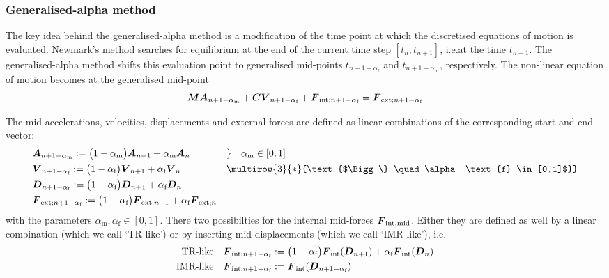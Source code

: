 \subsubsection{Generalised-alpha method}
The key idea behind the generalised-alpha method is a modification of the
time point at
which the discretised equations of motion is evaluated. Newmark's method
searches for equilibrium at the end of the current time step $[t_n,t_{n+1}]$,
i.e.\@ at the time $t_{n+1}$. The generalised-alpha method shifts this
evaluation point to  generalised mid-points
$t_{n+1-\alpha_\text{f}}$ and $t_{n+1-\alpha_\text{m}}$, respectively. The non-linear
equation of motion becomes at the generalised mid-point\\
\begin{equation}
  \mat{M} \vct{A}_{n+1-\alpha_\text{m}}
  + \mat{C} \vct{V}_{n+1-\alpha_\text{f}}
  + \vct{F}_{\Int;n+1-\alpha_\text{f}} %
  = \vct{F}_{\Ext;n+1-\alpha_\text{f}}
\end{equation}

The mid accelerations, velocities, displacements and external forces are
defined as linear combinations of the corresponding start and end vector:\\
\begin{equation}\label{eq:genalpha-middef}
\begin{aligned}
&   \vct{A}_{n+1-\alpha_\text{m}}
    := \big( 1- \alpha_\text{m} \big) \vct{A}_{n+1}
    + \alpha_\text{m} \vct{A}_n
&& \} \quad \alpha_\text{m} \in[0,1]
\\
&   \vct{V}_{n+1-\alpha_\text{f}}
    := \big( 1- \alpha_\text{f} \big) \vct{V}_{n+1}
    + \alpha_\text{f} \vct{V}_n
&&  \multirow{3}{*}{\text{$\Bigg\} \quad \alpha_\text{f} \in[0,1]$}}
\\
&   \vct{D}_{n+1-\alpha_\text{f}}
    := \big( 1- \alpha_\text{f} \big) \vct{D}_{n+1}
    + \alpha_\text{f} \vct{D}_n
&&
\\
&   \vct{F}_{\Ext;n+1-\alpha_\text{f}}
    := \big( 1- \alpha_\text{f} \big) \vct{F}_{\Ext;n+1}
    + \alpha_\text{f} \vct{F}_{\Ext;n}
&&
\end{aligned}
\end{equation}
with the parameters $\alpha_\text{m},\alpha_\text{f}\in[0,1]$. There two possibilties for the internal mid-forces $\boldsymbol{F}_{\text{int},\text{mid}}$. Either they are defined as well by a linear combination (which we call `TR-like') or by inserting mid-displacements (which we call `IMR-like'), i.e.
\begin{align}
  \text{TR-like} & \quad \boldsymbol{F}_{\text{int};n+1-\alpha_\text{f}}
    := \big( 1- \alpha_\text{f} \big) \boldsymbol{F}_{\text{int}}(\boldsymbol{D}_{n+1})
    + \alpha_\text{f} \boldsymbol{F}_{\text{int}}(\boldsymbol{D}_{n})
\\
  \text{IMR-like} & \quad \boldsymbol{F}_ {\text{int};n+1-\alpha_\text{f}} :=  \boldsymbol{F}_{\text{int}}(\boldsymbol{D}_{n+1-\alpha_\text{f}})
\end{align}

